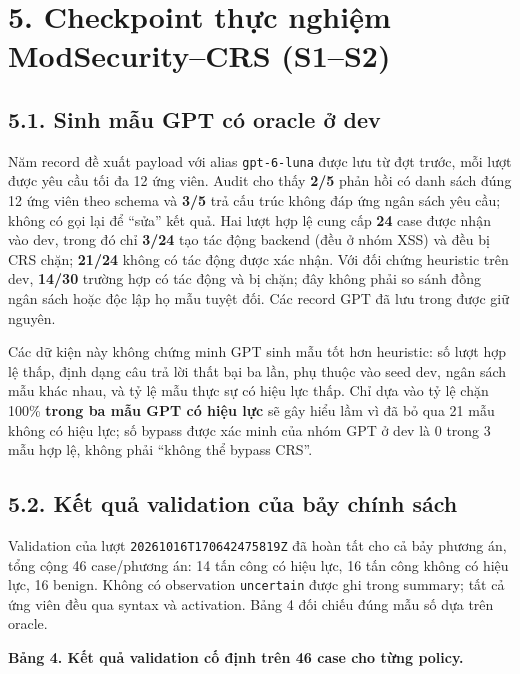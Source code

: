\documentclass[
  10pt,
  a4paper,
]{article}
\begin{document}
\section{5. Checkpoint thực nghiệm ModSecurity--CRS
(S1--S2)}\label{checkpoint-thux1ef1c-nghiux1ec7m-modsecuritycrs-s1s2}

\subsection{5.1. Sinh mẫu GPT có oracle ở
dev}\label{sinh-mux1eabu-gpt-cuxf3-oracle-ux1edf-dev}

Năm record đề xuất payload với alias \texttt{gpt-6-luna} được lưu từ đợt
trước, mỗi lượt được yêu cầu tối đa 12 ứng viên. Audit cho thấy
\textbf{2/5} phản hồi có danh sách đúng 12 ứng viên theo schema và
\textbf{3/5} trả cấu trúc không đáp ứng ngân sách yêu cầu; không có gọi
lại để ``sửa'' kết quả. Hai lượt hợp lệ cung cấp \textbf{24} case được
nhận vào dev, trong đó chỉ \textbf{3/24} tạo tác động backend (đều ở
nhóm XSS) và đều bị CRS chặn; \textbf{21/24} không có tác động được xác
nhận. Với đối chứng heuristic trên dev, \textbf{14/30} trường hợp có tác
động và bị chặn; đây không phải so sánh đồng ngân sách hoặc độc lập họ
mẫu tuyệt đối. Các record GPT đã lưu trong
 được giữ
nguyên.

Các dữ kiện này không chứng minh GPT sinh mẫu tốt hơn heuristic: số lượt
hợp lệ thấp, định dạng câu trả lời thất bại ba lần, phụ thuộc vào seed
dev, ngân sách mẫu khác nhau, và tỷ lệ mẫu thực sự có hiệu lực thấp. Chỉ
dựa vào tỷ lệ chặn 100\% \textbf{trong ba mẫu GPT có hiệu lực} sẽ gây
hiểu lầm vì đã bỏ qua 21 mẫu không có hiệu lực; số bypass được xác minh
của nhóm GPT ở dev là 0 trong 3 mẫu hợp lệ, không phải ``không thể
bypass CRS''.

\subsection{5.2. Kết quả validation của bảy chính
sách}\label{kux1ebft-quux1ea3-validation-cux1ee7a-bux1ea3y-chuxednh-suxe1ch}

Validation của lượt \texttt{20261016T170642475819Z} đã hoàn tất cho cả
bảy phương án, tổng cộng 46 case/phương án: 14 tấn công có hiệu lực, 16
tấn công không có hiệu lực, 16 benign. Không có observation
\texttt{uncertain} được ghi trong summary; tất cả ứng viên đều qua
syntax và activation. Bảng 4 đối chiếu đúng mẫu số dựa trên oracle.

\textbf{Bảng 4. Kết quả validation cố định trên 46 case cho từng
policy.}
\end{document}
